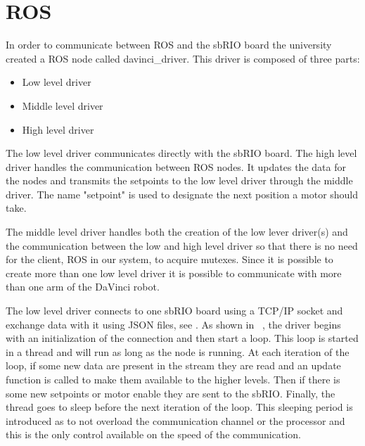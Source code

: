 \section{ROS}\label{sec:ros}

In order to communicate between ROS and the sbRIO board the university created a ROS node called davinci\_driver. This driver is composed of three parts:

\begin{itemize}
\item Low level driver
\item Middle level driver
\item High level driver
\end{itemize}

The low level driver communicates directly with the sbRIO board. The high level driver handles the communication between ROS nodes. It updates the data for the nodes and transmits the setpoints to the low level driver through the middle driver. The name "setpoint" is used to designate the next position a motor should take.

The middle level driver handles both the creation of the low lever driver(s) and the communication between the low and high level driver so that there is no need for the client, ROS in our system, to acquire mutexes. Since it is possible to create more than one low level driver it is possible to communicate with more than one arm of the DaVinci robot.

The low level driver connects to one sbRIO board using a TCP/IP socket and exchange data with it using \gls{JSON} files, see . As shown in ~, the driver begins with an initialization of the connection and then start a loop. This loop is started in a thread and will run as long as the node is running. At each iteration of the loop, if some new data are present in the stream they are read and an update function is called to make them available to the higher levels. Then if there is some new setpoints or motor enable they are sent to the sbRIO. Finally, the thread goes to sleep before the next iteration of the loop. This sleeping period is introduced as to not overload the communication channel or the processor and this is the only control available on the speed of the communication.

